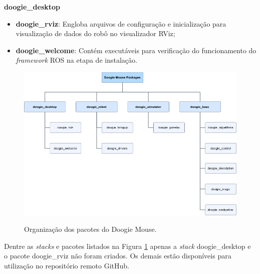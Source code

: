 \textbf{doogie\_desktop}
\begin{itemize}
	\item \textbf{doogie\_rviz}: Engloba arquivos de configuração e inicialização para visualização de dados do robô no visualizador RViz;
	\item \textbf{doogie\_welcome}: Contém executáveis para verificação do funcionamento do \textit{framework} ROS na etapa de instalação.
\end{itemize}

\begin{figure}[H]
	\centering
	\caption{Organização dos pacotes do Doogie Mouse.}
	\includegraphics[width=1\textwidth]
	{Figures/doogie_packages}
	\label{fig:doogie_packages}
\end{figure}

Dentre as \textit{stacks} e pacotes listados na Figura \ref{fig:doogie_packages} apenas a \textit{stack} doogie\_desktop e o pacote doogie\_rviz não foram criados. Os demais estão disponíveis para utilização no repositório remoto GitHub.

